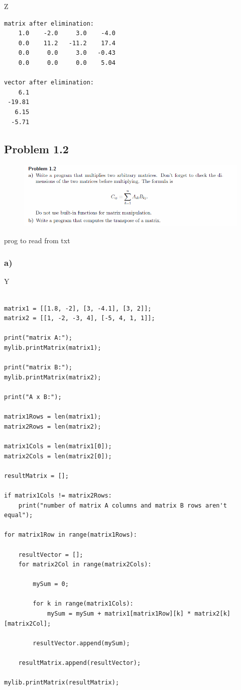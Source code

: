 Z

\begin{lstlisting}[caption=Result of 1.1 c), keywordstyle=\color{black}]
matrix after elimination:
    1.0    -2.0     3.0    -4.0
    0.0    11.2   -11.2    17.4
    0.0     0.0     3.0   -0.43
    0.0     0.0     0.0    5.04

vector after elimination:
    6.1
 -19.81
   6.15
  -5.71
\end{lstlisting}


\subsection{Problem 1.2}


\begin{figure}[!ht]
\includegraphics[width=1\textwidth]{chapters/images/desc-1-2}
\end{figure}




prog to read from txt

\subsubsection{a)}

Y

\begin{lstlisting}[caption=todo]

matrix1 = [[1.8, -2], [3, -4.1], [3, 2]];
matrix2 = [[1, -2, -3, 4], [-5, 4, 1, 1]];

print("matrix A:");
mylib.printMatrix(matrix1);

print("matrix B:");
mylib.printMatrix(matrix2);

print("A x B:");

matrix1Rows = len(matrix1);
matrix2Rows = len(matrix2);

matrix1Cols = len(matrix1[0]);
matrix2Cols = len(matrix2[0]);

resultMatrix = [];

if matrix1Cols != matrix2Rows:
	print("number of matrix A columns and matrix B rows aren't equal");

for matrix1Row in range(matrix1Rows):

	resultVector = [];
	for matrix2Col in range(matrix2Cols):
		
		mySum = 0;
		
		for k in range(matrix1Cols):
			mySum = mySum + matrix1[matrix1Row][k] * matrix2[k][matrix2Col];
		
		resultVector.append(mySum);
		
	resultMatrix.append(resultVector);

mylib.printMatrix(resultMatrix);

\end{lstlisting}

